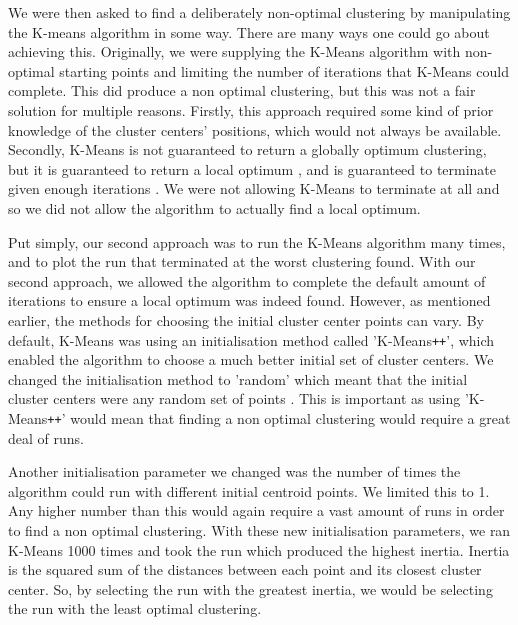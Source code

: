 \documentclass[a4paper]{article}
\begin{document}
We were then asked to find a deliberately non-optimal clustering by manipulating the K-means algorithm in some way. There are many ways one could go about achieving this. Originally, we were supplying the K-Means algorithm with non-optimal starting points and limiting the number of iterations that K-Means could complete. This did produce a non optimal clustering, but this was not a fair solution for multiple reasons. Firstly, this approach required some kind of prior knowledge of the cluster centers' positions, which would not always be available. Secondly, K-Means is not guaranteed to return a globally optimum clustering, but it is guaranteed to return a local optimum \cite{kmeans}, and is guaranteed to terminate given enough iterations \cite{kmeansintro}. We were not allowing K-Means to terminate at all and so we did not allow the algorithm to actually find a local optimum. 

Put simply, our second approach was to run the K-Means algorithm many times, and to plot the run that terminated at the worst clustering found. With our second approach, we allowed the algorithm to complete the default amount of iterations to ensure a local optimum was indeed found. However, as mentioned earlier, the methods for choosing the initial cluster center points can vary. By default, K-Means was using an initialisation method called 'K-Means\texttt{+}\texttt{+}', which enabled the algorithm to choose a much better initial set of cluster centers. We changed the initialisation method to 'random' which meant that the initial cluster centers were any random set of points \cite{scikit-learn}. This is important as using 'K-Means\texttt{+}\texttt{+}' would mean that finding a non optimal clustering would require a great deal of runs.

Another initialisation parameter we changed was the number of times the algorithm could run with different initial centroid points. We limited this to 1. Any higher number than this would again require a vast amount of runs in order to find a non optimal clustering. With these new initialisation parameters, we ran K-Means 1000 times and took the run which produced the highest inertia. Inertia is the squared sum of the distances between each point and its closest cluster center. So, by selecting the run with the greatest inertia, we would be selecting the run with the least optimal clustering.
\end{document}
